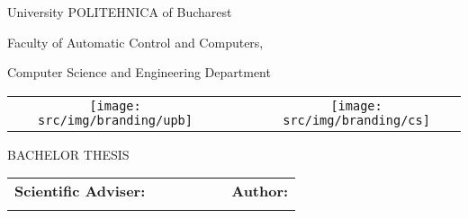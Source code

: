 \begin{titlepage}
	\begin{center}
		{\Large University POLITEHNICA of Bucharest}
		\par\vspace*{2mm}
		{\Large Faculty of Automatic Control and Computers,
		
		Computer Science and Engineering Department}
		\par\vspace*{3mm}
		\begin{table*}[h]
        	\begin{center}
				\begin{tabular}{cccc}
                    \texttt{[image: src/img/branding/upb]}
					& & &
					\texttt{[image: src/img/branding/cs]}
            	\end{tabular}
			\end{center}
		\end{table*}
		
		\par\vspace*{35mm}
		{\Huge BACHELOR THESIS}
		\par\vspace*{15mm}
		{\Huge \VARtitleen}
		\par\vspace*{35mm}
		\begin{table*}[h]
        	\begin{center}
				\begin{tabular}{lcccccl}
					\Large \textbf{\Large Scientific Adviser:}
					\vspace*{1mm} &&&&&& \Large \textbf{\Large Author:}\vspace*{1mm} \\
					\Large \VARadviser &&&&&& \Large \VARauthor
				\end{tabular}
			\end{center}
		\end{table*}

		\par\vspace*{40mm}
		\Large \VARtitlefooteren
	\end{center}
\end{titlepage}
